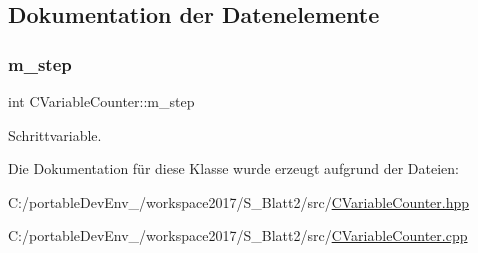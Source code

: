 \subsection{Dokumentation der Datenelemente}
\mbox{\label{class_c_variable_counter_a970fd88636f33c50c7c3005f92bebf87}} 
\subsubsection{\texorpdfstring{m\+\_\+step}{m\_step}}
{\footnotesize\ttfamily int C\+Variable\+Counter\+::m\+\_\+step\hspace{0.3cm}{\ttfamily [protected]}}



Schrittvariable. 



Die Dokumentation für diese Klasse wurde erzeugt aufgrund der Dateien\+:\begin{DoxyCompactItemize}
\item 
C\+:/portable\+Dev\+Env\+\_/workspace2017/\+S\+\_\+\+Blatt2/src/\hyperlink{_c_variable_counter_8hpp}{C\+Variable\+Counter.\+hpp}\item 
C\+:/portable\+Dev\+Env\+\_/workspace2017/\+S\+\_\+\+Blatt2/src/\hyperlink{_c_variable_counter_8cpp}{C\+Variable\+Counter.\+cpp}\end{DoxyCompactItemize}
